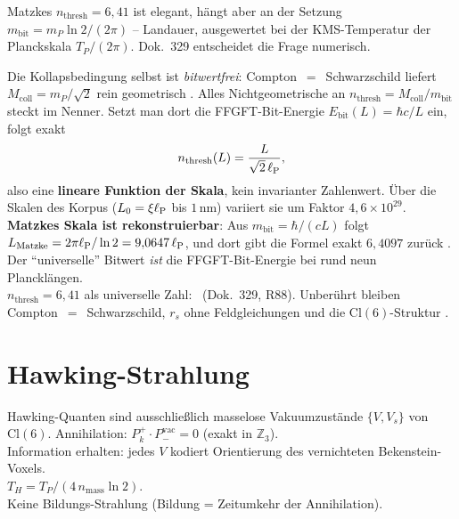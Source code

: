 \begin{tcolorbox}[divbox, title={Entschieden: die Schwelle ist skalenabhängig \B\ (Dok.~329)}]
  Matzkes $n_{\mathrm{thresh}} = 6{,}41$ ist elegant, hängt aber an der Setzung
  $m_{\mathrm{bit}} = m_P\ln 2/(2\pi)$ -- Landauer, ausgewertet bei der
  KMS-Temperatur der Planckskala $T_P/(2\pi)$.
  Dok.~329 entscheidet die Frage numerisch.

  Die Kollapsbedingung selbst ist \emph{bitwertfrei}: Compton~$=$~Schwarzschild
  liefert $M_{\mathrm{coll}} = m_P/\sqrt{2}$ rein geometrisch \B.
  Alles Nichtgeometrische an $n_{\mathrm{thresh}} = M_{\mathrm{coll}}/m_{\mathrm{bit}}$
  steckt im Nenner. Setzt man dort die FFGFT-Bit-Energie
  $E_{\mathrm{bit}}(L) = \hbar c/L$ ein, folgt exakt
  \begin{equation}
    n_{\mathrm{thresh}}(L) = \frac{L}{\sqrt{2}\,\ell_{\mathrm{P}}},
  \end{equation}
  also eine \textbf{lineare Funktion der Skala}, kein invarianter Zahlenwert.
  Über die Skalen des Korpus ($L_0 = \xi\ell_{\mathrm{P}}$ bis $1$\,nm) variiert sie um
  Faktor $4{,}6\times10^{29}$.\\[4pt]
  \textbf{Matzkes Skala ist rekonstruierbar}: Aus
  $m_{\mathrm{bit}} = \hbar/(cL)$ folgt
  $L_{\mathrm{Matzke}} = 2\pi\ell_{\mathrm{P}}/\ln 2 = 9{,}0647\,\ell_{\mathrm{P}}$, und dort gibt die
  Formel exakt $6{,}4097$ zurück \B. Der \enquote{universelle} Bitwert
  \emph{ist} die FFGFT-Bit-Energie bei rund neun Plancklängen.\\[4pt]
  $n_{\mathrm{thresh}} = 6{,}41$ als universelle Zahl: \X\ (Dok.~329, R88).
  Unberührt bleiben Compton~$=$~Schwarzschild, $r_s$ ohne Feldgleichungen
  und die $\mathrm{Cl}(6)$-Struktur \B.
\end{tcolorbox}

\section{Hawking-Strahlung}

\begin{tcolorbox}[matzbox, title={Matzke}]
  Hawking-Quanten sind ausschließlich masselose Vakuumzustände $\{V, V_s\}$ von $\mathrm{Cl}(6)$.
  Annihilation: $P_k^+ \cdot P_-^{\mathrm{vac}} = 0$ (exakt in $\mathbb{Z}_3$). \B\\
  Information erhalten: jedes $V$ kodiert Orientierung des vernichteten Bekenstein-Voxels.\\
  $T_H = T_P/(4\,n_{\mathrm{mass}}\ln 2)$. \B\\
  Keine Bildungs-Strahlung (Bildung = Zeitumkehr der Annihilation).
\end{tcolorbox}

